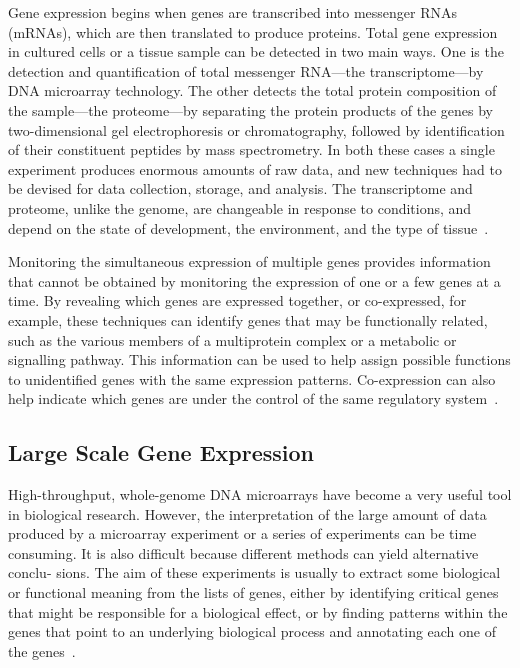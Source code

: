 \documentclass{report}
\begin{document}
Gene expression begins when genes are transcribed into messenger RNAs (mRNAs), which are then translated to produce proteins. Total gene expression in cultured cells or a tissue sample can be detected in two main ways. One is the detection and quantification of total messenger RNA—the transcriptome—by DNA microarray technology. The other detects the total protein composition of the sample—the proteome—by separating the protein products of the genes by two-dimensional gel electrophoresis or chromatography, followed by identification of their constituent peptides by mass spectrometry. In both these cases a single experiment produces enormous amounts of raw data, and new techniques had to be devised for data collection, storage, and analysis. The transcriptome and proteome, unlike the genome, are changeable in response to conditions, and depend on the state of development, the environment, and the type of tissue~\cite{zvelebil_understanding_2008}.

Monitoring the simultaneous expression of multiple genes provides information that cannot be obtained by monitoring the expression of one or a few genes at a time. By revealing which genes are expressed together, or co-expressed, for example, these techniques can identify genes that may be functionally related, such as the various members of a multiprotein complex or a metabolic or signalling pathway. This information can be used to help assign possible functions to unidentified genes with the same expression patterns. Co-expression can also help indicate which genes are under the control of the same regulatory system~\cite{zvelebil_understanding_2008}.


\subsection{Large Scale Gene Expression}

High-throughput, whole-genome DNA microarrays have become a very useful tool in biological research. However, the interpretation of the large amount of data produced by a microarray experiment or a series of experiments can be time consuming. It is also difficult because different methods can yield alternative conclu- sions. The aim of these experiments is usually to extract some biological or functional meaning from the lists of genes, either by identifying critical genes that might be responsible for a biological effect, or by finding patterns within the genes that point to an underlying biological process and annotating each one of the genes~\cite{zvelebil_understanding_2008}.
\end{document}
